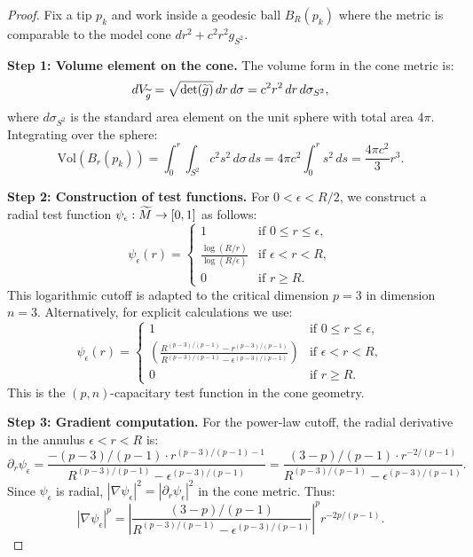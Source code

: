 \begin{proof}
Fix a tip $p_k$ and work inside a geodesic ball $B_R(p_k)$ where the metric is comparable to the model cone $dr^2 + c^2 r^2 g_{S^2}$.

\textbf{Step 1: Volume element on the cone.}
The volume form in the cone metric is:
\[
    dV_{\widetilde{g}} = \sqrt{\det(\widetilde{g})} \, dr \, d\sigma = c^2 r^2 \, dr \, d\sigma_{S^2},
\]
where $d\sigma_{S^2}$ is the standard area element on the unit sphere with total area $4\pi$. Integrating over the sphere:
\[
    \text{Vol}(B_r(p_k)) = \int_0^r \int_{S^2} c^2 s^2 \, d\sigma \, ds = 4\pi c^2 \int_0^r s^2 \, ds = \frac{4\pi c^2}{3} r^3.
\]

\textbf{Step 2: Construction of test functions.}
For $0 < \epsilon < R/2$, we construct a radial test function $\psi_\epsilon : \widetilde{M} \to [0,1]$ as follows:
\[
\psi_\epsilon(r) = \begin{cases}
1 & \text{if } 0 \le r \le \epsilon,\\[4pt]
\displaystyle\frac{\log(R/r)}{\log(R/\epsilon)} & \text{if } \epsilon < r < R,\\[6pt]
0 & \text{if } r \ge R.
\end{cases}
\]
This logarithmic cutoff is adapted to the critical dimension $p = 3$ in dimension $n = 3$. Alternatively, for explicit calculations we use:
\[
\psi_\epsilon(r) = \begin{cases}
1 & \text{if } 0 \le r \le \epsilon,\\[4pt]
\displaystyle\left(\frac{R^{(p-3)/(p-1)} - r^{(p-3)/(p-1)}}{R^{(p-3)/(p-1)} - \epsilon^{(p-3)/(p-1)}}\right) & \text{if } \epsilon < r < R,\\[6pt]
0 & \text{if } r \ge R.
\end{cases}
\]
This is the $(p,n)$-capacitary test function in the cone geometry.

\textbf{Step 3: Gradient computation.}
For the power-law cutoff, the radial derivative in the annulus $\epsilon < r < R$ is:
\[
    \partial_r \psi_\epsilon = \frac{-(p-3)/(p-1) \cdot r^{(p-3)/(p-1)-1}}{R^{(p-3)/(p-1)} - \epsilon^{(p-3)/(p-1)}} = \frac{(3-p)/(p-1) \cdot r^{-2/(p-1)}}{R^{(p-3)/(p-1)} - \epsilon^{(p-3)/(p-1)}}.
\]
Since $\psi_\epsilon$ is radial, $|\nabla \psi_\epsilon|^2 = |\partial_r \psi_\epsilon|^2$ in the cone metric. Thus:
\[
    |\nabla \psi_\epsilon|^p = \left| \frac{(3-p)/(p-1)}{R^{(p-3)/(p-1)} - \epsilon^{(p-3)/(p-1)}} \right|^p r^{-2p/(p-1)}.
\]


\end{proof}
